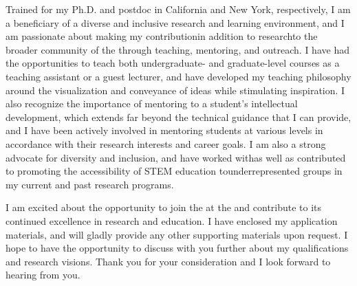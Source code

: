 

Trained for my Ph.D. and postdoc in California and New York, respectively, I am a beneficiary of a diverse and inclusive research and learning environment, and I am passionate about making my contribution\textemdash in addition to research\textemdash to the broader community of the \appSchool{} through teaching, mentoring, and outreach. I have had the opportunities to teach both undergraduate- and graduate-level courses as a teaching assistant or a guest lecturer, and have developed my teaching philosophy around the visualization and conveyance of ideas while stimulating inspiration. I also recognize the importance of mentoring to a student's intellectual development, which extends far beyond the technical guidance that I can provide, and I have been actively involved in mentoring students at various levels in accordance with their research interests and career goals. I am also a strong advocate for diversity and inclusion, and have worked with\textemdash as well as contributed to promoting the accessibility of STEM education to\textemdash underrepresented groups in my current and past research programs.

I am excited about the opportunity to join the \appDept{} at the \appSchool{} and contribute to its continued excellence in research and education. I have enclosed my application materials, and will gladly provide any other supporting materials upon request. I hope to have the opportunity to discuss with you further about my qualifications and research visions. Thank you for your consideration and I look forward to hearing from you.

